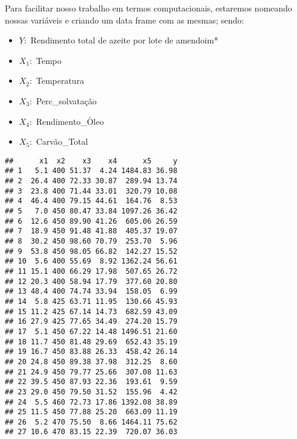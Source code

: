 \documentclass[
]{article}
\newenvironment{Shaded}{\begin{snugshade}}{\end{snugshade}}
\newcommand{\KeywordTok}[1]{\textcolor[rgb]{0.13,0.29,0.53}{\textbf{#1}}}
\newcommand{\NormalTok}[1]{#1}
\newcommand{\OperatorTok}[1]{\textcolor[rgb]{0.81,0.36,0.00}{\textbf{#1}}}
\newcommand{\StringTok}[1]{\textcolor[rgb]{0.31,0.60,0.02}{#1}}
\begin{document}
Para facilitar nosso trabalho em termos computacionais, estaremos
nomeando nossas variáveis e criando um data frame com as mesmas; sendo:

\begin{itemize}
\item
  \(Y:\) Rendimento total de azeite por lote de amendoim*
\item
  \(X_1:\) Tempo
\item
  \(X_2:\) Temperatura
\item
  \(X_3:\) Perc\_solvatação
\item
  \(X_4:\) Rendimento\_Òleo
\item
  \(X_5:\) Carvão\_Total
\end{itemize}

\begin{Shaded}
\end{Shaded}

\begin{verbatim}
##      x1  x2    x3    x4      x5     y
## 1   5.1 400 51.37  4.24 1484.83 36.98
## 2  26.4 400 72.33 30.87  289.94 13.74
## 3  23.8 400 71.44 33.01  320.79 10.08
## 4  46.4 400 79.15 44.61  164.76  8.53
## 5   7.0 450 80.47 33.84 1097.26 36.42
## 6  12.6 450 89.90 41.26  605.06 26.59
## 7  18.9 450 91.48 41.88  405.37 19.07
## 8  30.2 450 98.60 70.79  253.70  5.96
## 9  53.8 450 98.05 66.82  142.27 15.52
## 10  5.6 400 55.69  8.92 1362.24 56.61
## 11 15.1 400 66.29 17.98  507.65 26.72
## 12 20.3 400 58.94 17.79  377.60 20.80
## 13 48.4 400 74.74 33.94  158.05  6.99
## 14  5.8 425 63.71 11.95  130.66 45.93
## 15 11.2 425 67.14 14.73  682.59 43.09
## 16 27.9 425 77.65 34.49  274.20 15.79
## 17  5.1 450 67.22 14.48 1496.51 21.60
## 18 11.7 450 81.48 29.69  652.43 35.19
## 19 16.7 450 83.88 26.33  458.42 26.14
## 20 24.8 450 89.38 37.98  312.25  8.60
## 21 24.9 450 79.77 25.66  307.08 11.63
## 22 39.5 450 87.93 22.36  193.61  9.59
## 23 29.0 450 79.50 31.52  155.96  4.42
## 24  5.5 460 72.73 17.86 1392.08 38.89
## 25 11.5 450 77.88 25.20  663.09 11.19
## 26  5.2 470 75.50  8.66 1464.11 75.62
## 27 10.6 470 83.15 22.39  720.07 36.03
\end{verbatim}
\end{document}
